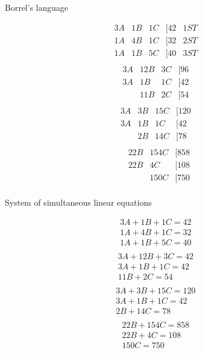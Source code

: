 \documentclass[11pt]{article}
\begin{document}
\begin{minipage}{0.45\textwidth}
 	\begin{center}
 	  Borrel's language
 	\end{center}
	\[
    	\begin{array}{ccccc}
		3A & 1B & 1C & [42 & 1ST\\
		1A & 4B & 1C & [32 & 2ST\\
		1A & 1B & 5C & [40 & 3ST\\
		\end{array}
    \]
    \[
    	\begin{array}{cccc}
		3A & 12B & 3C & [96 \\
		3A & 1B & 1C & [42 \\
		   & 11B & 2C & [54 \\
		\end{array}
    \]
    \[
    	\begin{array}{cccc}
		3A & 3B & 15C & [120 \\
		3A & 1B & 1C & [42 \\
		   & 2B & 14C & [78 \\
		\end{array}
    \]
    \[
    	\begin{array}{cccc}
			& 22B & 154C & [858 \\
		    & 22B & 4C & [108 \\
		   	&	 & 150C & [750 \\
		\end{array}
    \]
\end{minipage}%
\hfill
\begin{minipage}{0.45\textwidth}
	\begin{center}
    System of simultaneous linear equations
  \end{center}
    \[
    	\begin{array}{c}
		3A + 1B + 1C = 42 \\
        1A + 4B + 1C = 32 \\
        1A + 1B + 5C = 40 \\
		\end{array}
    \]
    \[
    	\begin{array}{c}
		3A + 12B + 3C = 42 \\
        3A + 1B + 1C = 42 \\
             11B + 2C = 54 \\
		\end{array}
    \]
    \[
    	\begin{array}{c}
		3A + 3B + 15C = 120 \\
        3A + 1B + 1C = 42 \\
             2B + 14C = 78 \\
		\end{array}
    \]
    \[
    	\begin{array}{c}
		22B + 154C = 858 \\
        22B + 4C = 108\\
             150C = 750 \\
		\end{array}
    \]
\end{minipage}%
\end{document}
